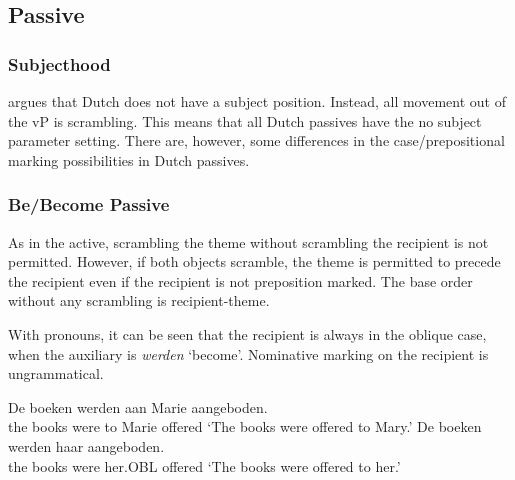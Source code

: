 \subsection{Passive}
\subsubsection{Subjecthood}
\cite{Besten.1990} argues that Dutch does not have a subject position. Instead, all movement out of the vP is scrambling. This means that all Dutch passives have the no subject parameter setting. There are, however, some differences in the case/prepositional marking possibilities in Dutch passives.

\subsubsection{Be/Become Passive}
As in the active, scrambling the theme without scrambling the recipient is not permitted. However, if both objects scramble, the theme is permitted to precede the recipient even if the recipient is not preposition marked. The base order without any scrambling is recipient-theme.
\begin{exe}
\end{exe}
With pronouns, it can be seen that the recipient is always in the oblique case, when the auxiliary is \emph{werden} `become'. Nominative marking on the recipient is ungrammatical.
\begin{exe}
\ex De boeken werden aan Marie aangeboden. \\
the books were to Marie offered
\trans `The books were offered to Mary.' \citep[ex. 5a]{Broekhuis.1994}
\ex De boeken werden haar aangeboden. \\
the books were her.OBL offered
\trans `The books were offered to her.' \citep[ex. 5b]{Broekhuis.1994}
\end{exe}
